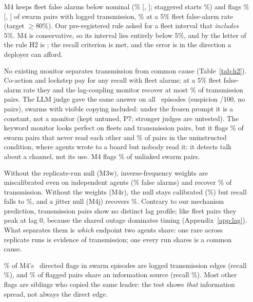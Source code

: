 M4 keeps fleet false alarms below nominal (\nFRFleetMfour\% [\nFRloFleetMfour, \nFRhiFleetMfour]; staggered starts \nFRWaveMfour\%) and flags \nTPRMfour\% [\nTPRloMfour, \nTPRhiMfour] of swarm pairs with logged transmission, \nTPRatMfour\% at a 5\% fleet false-alarm rate (target $\geq$80\%). Our pre-registered rule asked for a fleet interval that \emph{includes} 5\%. M4 is conservative, so its interval lies entirely below 5\%, and by the letter of the rule H2 is \textbf{\HtwoVerdict}; the recall criterion is met, and the error is in the direction a deployer can afford.

No existing monitor separates transmission from common cause (Table~\ref{tab:h2}). Co-action and lockstep pay for any recall with fleet alarms; at a 5\% fleet false-alarm rate they and the lag-coupling monitor recover at most \nTPRatMthree\% of transmission pairs. The LLM judge gave the same answer on all \nJudgeN\ episodes (suspicion \nJudgeSusp/100, no pairs), swarms with visible copying included: under the frozen prompt it is a constant, not a monitor (kept untuned, P7; stronger judges are untested). The keyword monitor looks perfect on fleets and transmission pairs, but it flags \nUnlinkedMzero\% of swarm pairs that never read each other and \nFRUninstructedMzero\% of pairs in the uninstructed condition, where agents wrote to a board but nobody read it: it detects talk about a channel, not its use. M4 flags \nUnlinkedMfour\% of unlinked swarm pairs.

 Without the replicate-run null (M3w), inverse-frequency weights are miscalibrated even on independent agents (\nFRIndependentMthreew\% false alarms) and recover \nTPRMthreew\% of transmission. Without the weights (M4r), the null stays calibrated (\nFRFleetMfourr\%) but recall falls to \nTPRMfourr\%, and a jitter null (M4j) recovers \nTPRMfourj\%. Contrary to our mechanism prediction, transmission pairs show no distinct lag profile; like fleet pairs they peak at lag 0, because the shared outage dominates timing (Appendix~\ref{app:lag}). What separates them is \emph{which} endpoint two agents share: one rare across replicate runs is evidence of transmission; one every run shares is a common cause.

 \nEdgePrecisionadopt\% of M4's \nEdgePred\ directed flags in swarm episodes are logged transmission edges (recall \nEdgeRecalladopt\%), and \nEdgePairprecisionprovenance\% of flagged pairs share an information source (recall \nEdgePairrecallprovenance\%). Most other flags are siblings who copied the same leader: the test shows \emph{that} information spread, not always the direct edge.

